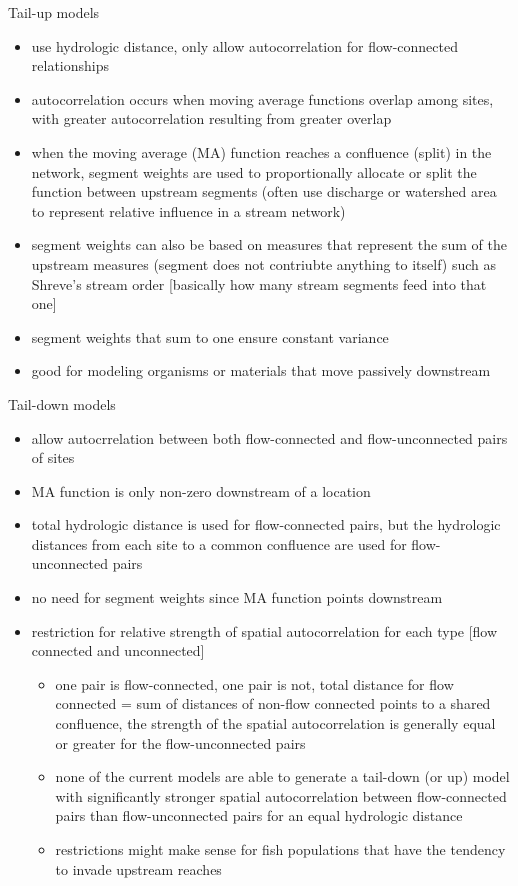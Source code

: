 \documentclass[12pt]{amsart}
\begin{document}
Tail-up models
\begin{itemize}
\item use hydrologic distance, only allow autocorrelation for flow-connected relationships
\item autocorrelation occurs when moving average functions overlap among sites, with greater autocorrelation resulting from greater overlap
\item when the moving average (MA) function reaches a confluence (split) in the network, segment weights are used to proportionally allocate or split the function between upstream segments (often use discharge or watershed area to represent relative influence in a stream network)
\item segment weights can also be based on measures that represent the sum of the upstream measures (segment does not contriubte anything to itself) such as Shreve's stream order [basically how many stream segments feed into that one]
\item segment weights that sum to one ensure constant variance
\item good for modeling organisms or materials that move passively downstream

\end{itemize}

Tail-down models
\begin{itemize}
\item allow autocrrelation between both flow-connected and flow-unconnected pairs of sites
\item MA function is only non-zero downstream of a location
\item total hydrologic distance is used for flow-connected pairs, but the hydrologic distances from each site to a common confluence are used for flow-unconnected pairs
\item no need for segment weights since MA function points downstream
\item restriction for relative strength of spatial autocorrelation for each type [flow connected and unconnected]
\begin{itemize}
\item one pair is flow-connected, one pair is not, total distance for flow connected = sum of distances of non-flow connected points to a shared confluence, the strength of the spatial autocorrelation is generally equal or greater for the flow-unconnected pairs
\item none of the current models are able to generate a tail-down (or up) model with significantly stronger spatial autocorrelation between flow-connected pairs than flow-unconnected pairs for an equal hydrologic distance
\item restrictions might make sense for fish populations that have the tendency to invade upstream reaches
\end{itemize}
\end{itemize}
\end{document}
